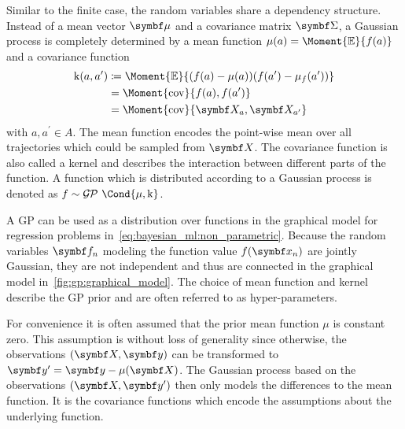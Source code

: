 Similar to the finite case, the random variables share a dependency structure.
Instead of a mean vector $\mat{\mu}$ and a covariance matrix $\mat{\Sigma}$, a Gaussian process is completely determined by a mean function $\mu(a) = \Moment{\E}{f(a)}$ and a covariance function
\begin{align}
    \begin{split}
        \K(a, a^\prime) &\coloneqq \Moment{\E}{(f(a) - \mu(a))(f(a^\prime) - \mu_f(a^\prime))} \\
        &= \Moment{\cov}{f(a), f(a^\prime)} \\
        &= \Moment{\cov}{\rv{X}_a, \rv{X}_{a^\prime}}
    \end{split}
\end{align}
with $a, a^\prime \in A$.
The mean function encodes the point-wise mean over all trajectories which could be sampled from $\rv{X}$.
The covariance function is also called a kernel and describes the interaction between different parts of the function.
A function which is distributed according to a Gaussian process is denoted as $f \sim \GP\Cond{\mu, \K}$.

A GP can be used as a distribution over functions in the graphical model for regression problems in~\cref{eq:bayesian_ml:non_parametric}.
Because the random variables $\mat{f}_n$ modeling the function value $f(\mat{x}_n)$ are jointly Gaussian, they are not independent and thus are connected in the graphical model in~\cref{fig:gp:graphical_model}.
The choice of mean function
and kernel
describe the GP prior and are often referred to as hyper-parameters.

For convenience it is often assumed that the prior mean function $\mu$ is constant zero.
This assumption is without loss of generality \cite{rasmussen_gaussian_2006} since otherwise, the observations $\left( \mat{X}, \mat{y} \right)$ can be transformed to $\mat{y^\prime} = \mat{y} - \mu(\mat{X})$.
The Gaussian process based on the observations $\left( \mat{X}, \mat{y^\prime} \right)$ then only models the differences to the mean function.
It is the covariance functions which encode the assumptions about the underlying function.

